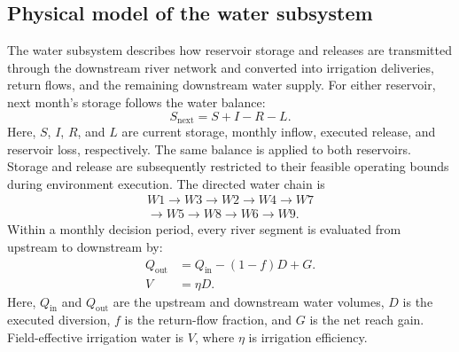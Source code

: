 \documentclass [a4paper,fleqn] {cas-dc}
\begin{document}
\subsection{Physical model of the water subsystem} \label{sec22}
The water subsystem describes how reservoir storage and releases are transmitted through the downstream river network and converted into irrigation deliveries, return flows, and the remaining downstream water supply. For either reservoir, next month's storage follows the water balance: 
\begin{equation}
  S_{\mathrm{next}}=S+I-R-L.
  \label{eq:reservoir-balance}
\end{equation}
Here, $S$, $I$, $R$, and $L$ are current storage, monthly inflow, executed release, and reservoir loss, respectively. The same balance is applied to both reservoirs. Storage and release are subsequently restricted to their feasible operating bounds during environment execution. The directed water chain is
\[
\begin{gathered}
  W1\rightarrow W3\rightarrow W2\rightarrow W4\rightarrow W7\\[-2pt]
  {}\rightarrow W5\rightarrow W8\rightarrow W6\rightarrow W9.
\end{gathered}
\]
Within a monthly decision period, every river segment is evaluated from upstream to downstream by:
\begin{align}
  Q_{\mathrm{out}}&=Q_{\mathrm{in}}-(1-f)D+G.
  \label{eq:reach-transfer}\\
  V&=\eta D.
  \label{eq:field-effective-water}
\end{align}
Here, $Q_{\mathrm{in}}$ and $Q_{\mathrm{out}}$ are the upstream and downstream water volumes, $D$ is the executed diversion, $f$ is the return-flow fraction, and $G$ is the net reach gain. Field-effective irrigation water is $V$, where $\eta$ is irrigation efficiency.

\end{document}
